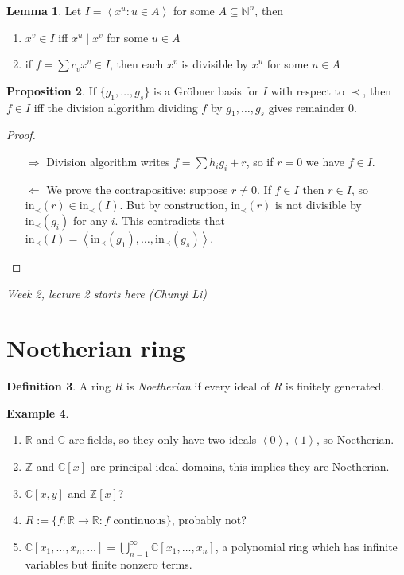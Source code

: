 \documentclass[a4paper]{article}
\newcommand{\la}{\left\langle}
\newcommand{\ra}{\right\rangle}
\newcommand{\Z}{\mathbb Z}
\newcommand{\C}{\mathbb C}
\newcommand{\In}{\text{in}}
\theoremstyle{definition}
\newtheorem{defn}{Definition}[subsection]
\newtheorem{prop}[defn]{Proposition}
\newtheorem{lemma}[defn]{Lemma}
\newtheorem{example}[defn]{Example}
\begin{document}
\begin{lemma}
\label{lemma:monomialIdealDivisible}
Let $I=\la x^u:u\in A\ra$ for some $A\subseteq \mathbb N^n$, then
\begin{enumerate}
\item $x^v\in I$ iff $x^u\mid x^v$ for some $u\in A$
\item if $f=\sum c_v x^v\in I$, then each $x^v$ is divisible by $x^u$ for some $u\in A$
\end{enumerate}
\end{lemma}

\begin{prop}
If $\{g_1,\ldots,g_s\}$ is a Gröbner basis for $I$ with respect to $\prec$, then $f\in I$ iff the division algorithm dividing $f$ by $g_1,\ldots,g_s$ gives remainder 0.
\end{prop}
\begin{proof}
\begin{itemize}
\item[$\Rightarrow$] Division algorithm writes $f=\sum h_i g_i+r$, so if $r=0$ we have $f\in I$.
\item[$\Leftarrow$] We prove the contrapositive: suppose $r\neq 0$. If $f\in I$ then $r\in I$, so $\In_\prec(r)\in \In_\prec(I)$. But by construction, $\In_\prec(r)$ is not divisible by $\In_\prec(g_i)$ for any $i$. This contradicts that $\In_\prec(I)=\la \In_\prec(g_1),\ldots,\In_\prec(g_s)\ra$.
\end{itemize}
\end{proof}

\begin{flushright}
\textit{Week 2, lecture 2 starts here (Chunyi Li)}
\end{flushright}

\section{Noetherian ring}
\begin{defn}
A ring $R$ is \textit{Noetherian} if every ideal of $R$ is finitely generated.
\end{defn}

\begin{example}
\label{example:noetherian}
\begin{enumerate}
\item $\mathbb R$ and $\C$ are fields, so they only have two ideals $\la 0\ra,\la 1\ra$, so Noetherian.
\item $\Z$ and $\C[x]$ are principal ideal domains, this implies they are Noetherian.
\item $\C[x,y]$ and $\Z[x]$?
\item $R:=\{f:\mathbb R\rightarrow\mathbb R:f\text{ continuous}\}$, probably not?
\item $\C[x_1,\ldots,x_n,\ldots]=\bigcup_{n=1}^{\infty} \C[x_1,\ldots,x_n]$, a polynomial ring which has infinite variables but finite nonzero terms.
\end{enumerate}
\end{example}
\end{document}
